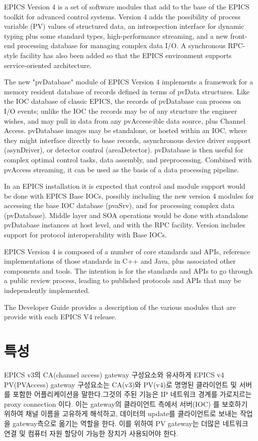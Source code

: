 \documentclass[11pt
  , a4paper
  , article
  , oneside
]{memoir}
\begin{document}
EPICS Version 4 is a set of software modules that add to the base of the EPICS toolkit for advanced control systems. Version 4 adds the possibility of process variable (PV) values of structured data, an introspection interface for dynamic typing plus some standard types, high-performance streaming, and a new front-end processing database for managing complex data I/O. A synchronous RPC-style facility has also been added so that the EPICS environment supports service-oriented architecture.

The new "pvDatabase" module of EPICS Version 4 implements a framework for a memory resident database of records defined in terms of pvData structures. Like the IOC database of classic EPICS, the records of pvDatabase can process on I/O events; unlike the IOC the records may be of any structure the engineer wishes, and may pull in data from any pvAccess-ible data source, plus Channel Access. pvDatabase images may be standalone, or hosted within an IOC, where they might interface directly to base records, asynchronous device driver support (asynDriver), or detector control (areaDetector). pvDatabase is then useful for complex optimal control tasks, data assembly, and preprocessing. Combined with pvAccess streaming, it can be used as the basis of a data processing pipeline.

In an EPICS installation it is expected that control and module support would be done with EPICS Base IOCs, possibly including the new version 4 modules for accessing the base IOC database (pvaSrv), and for processing complex data (pvDatabase). Middle layer and SOA operations would be done with standalone pvDatabase instances at host level, and with the RPC facility. Version includes support for protocol interoperability with Base IOCs.

EPICS Version 4 is composed of a number of core standards and APIs, reference implementations of those standards in C++ and Java, plus associated other components and tools. The intention is for the standards and APIs to go through a public review process, leading to published protocols and APIs that may be independently implemented.

The Developer Guide provides a description of the various modules that are provide with each EPICS V4 release.
\section{특성}
EPICS v3의 CA(channel access) gateway 구성요소와 유사하게 EPICS v4 PV(PVAccess) gateway 구성요소는 CA(v3)와 PV(v4)로 명명된 클라이언트 및 서버를 포함한 어플리케이션을 말한다.그것의 주된 기능은 IP 네트워크 경계를 가로지르는 proxy connection 이다. 이는 gateway의 클라이언트 측에서 서버(IOC) 를 보호하기 위하여 채널 이름을 고유하게 해석하고, 데이터의 update를 클라이언트로 보내는 작업을 gateway측으로 옮기는 역할을 한다. 이를 위하여 PV gateway는 더많은 네트워크 연결 및 컴퓨터 자원 할당이 가능한 장치가 사용되어야 한다. 
\end{document}
